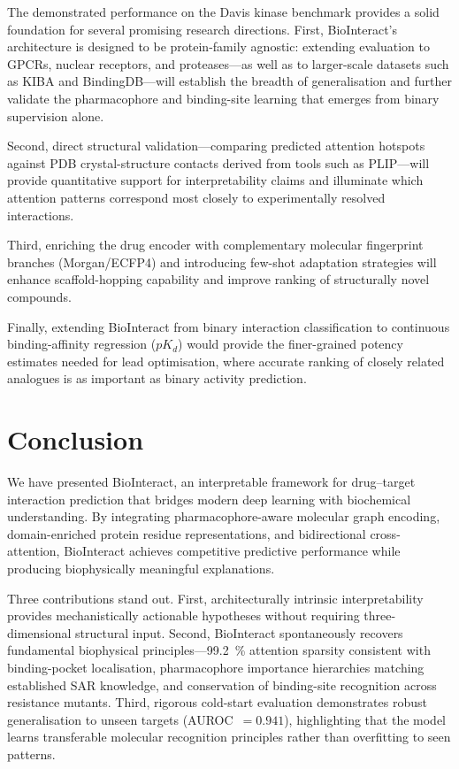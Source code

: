 \documentclass[fleqn,10pt]{wlscirep}
\begin{document}
The demonstrated performance on the Davis kinase benchmark provides a solid
foundation for several promising research directions.  First, BioInteract's
architecture is designed to be protein-family agnostic: extending evaluation to
GPCRs, nuclear receptors, and proteases---as well as to larger-scale datasets
such as KIBA and BindingDB---will establish the breadth of generalisation and
further validate the pharmacophore and binding-site learning that emerges from
binary supervision alone.

Second, direct structural validation---comparing predicted attention hotspots
against PDB crystal-structure contacts derived from tools such as
PLIP\cite{salentin2015plip}---will provide quantitative support for
interpretability claims and illuminate which attention patterns correspond most
closely to experimentally resolved interactions.

Third, enriching the drug encoder with complementary molecular fingerprint
branches (Morgan/ECFP4) and introducing few-shot adaptation strategies will
enhance scaffold-hopping capability and improve ranking of structurally novel
compounds.

Finally, extending BioInteract from binary interaction classification to
continuous binding-affinity regression ($pK_d$) would provide the finer-grained
potency estimates needed for lead optimisation, where accurate ranking of closely
related analogues is as important as binary activity prediction.

\section{Conclusion}
\label{sec:conclusion}

We have presented BioInteract, an interpretable framework for drug--target
interaction prediction that bridges modern deep learning with biochemical
understanding.  By integrating pharmacophore-aware molecular graph encoding,
domain-enriched protein residue representations, and bidirectional cross-attention,
BioInteract achieves competitive predictive performance while producing
biophysically meaningful explanations.

Three contributions stand out.  First, architecturally intrinsic interpretability
provides mechanistically actionable hypotheses without requiring three-dimensional
structural input.  Second, BioInteract spontaneously recovers fundamental
biophysical principles---\SI{99.2}{\percent} attention sparsity consistent with
binding-pocket localisation, pharmacophore importance hierarchies matching
established SAR knowledge, and conservation of binding-site recognition across
resistance mutants.  Third, rigorous cold-start evaluation demonstrates robust
generalisation to unseen targets (AUROC~$=0.941$), highlighting that the model
learns transferable molecular recognition principles rather than overfitting to
seen patterns.
\end{document}
